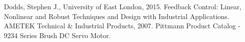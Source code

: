 \begin{thebibliography}{11} %
		Dodds, Stephen J., University of East London, 2015. Feedback Control: Linear, Nonlinear and Robust Techniques and Design with Industrial Applications.
		AMETEK Technical \& Industrial Products, 2007. Pittmann Product Catalog - 9234 Series Brush DC Servo Motor.
\end{thebibliography}